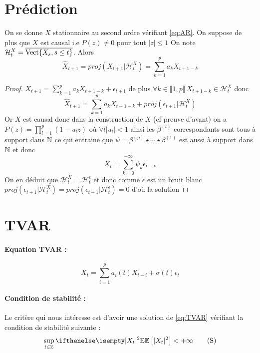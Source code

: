 \documentclass[a4paper,french]{article}
\begin{document}
\section{Prédiction}
\begin{Prop}
On se donne $X$ stationnaire au second ordre vérifiant \eqref{eq:AR}. On suppose de plus que $X$ est causal i.e $P(z) \neq 0$ pour tout $|z| \leq 1$
On note $\mathcal{H}_t^X = \overline{\mathrm{Vect}{ \left\lbrace X_s, s\leq t \right\rbrace }}$. Alors
\[ \hat{X}_{t+1} = proj(X_{t+1} | \mathcal{H}_t^X ) = \sum_{k=1}^p a_k X_{t+1-k} \]
\end{Prop}
\begin{proof}
$X_{t+1} = \sum_{k=1}^p a_k X_{t+1-k} +\epsilon_{t+1}$ de plus $\forall k \in \llbracket 1,p \rrbracket \, X_{t+1-k} \in \mathcal{H}_t^X$ donc
\[ \hat{X}_{t+1} = \sum_{k=1}^p a_k X_{t+1-k} + proj(\epsilon_{t+1} | \mathcal{H}_t^X ) \]
Or $X$ est causal donc dans la construction de $X$ (cf preuve d'avant) on a $P(z)= \prod_{l=1}^p (1-u_l z)$ où $\forall l |u_l|<1$ ainsi les $\beta^{(l)}$ correspondants sont tous à support dans $\mathbb{N}$ ce qui entraine que $\psi = \beta^{(p)} \star \cdots \star \beta^{(1)}$ est aussi à support dans $\mathbb{N}$ et donc 
\[ X_t = \sum_{k=0}^{+\infty} \psi_k \epsilon_{t-k}\] On en déduit que $\mathcal{H}_t^X = \mathcal{H}_t^\epsilon$ et donc comme $\epsilon$ est un bruit blanc $proj(\epsilon_{t+1} | \mathcal{H}_t^X ) = proj(\epsilon_{t+1} | \mathcal{H}_t^\epsilon ) = 0$ d'où la solution
\end{proof}

\section{TVAR}
\paragraph{Equation TVAR :}
\begin{equation} \label{eq:TVAR}
X_t = \sum_{i=1}^p a_i(t) X_{t-i} + \sigma(t) \epsilon_t
\tag{TVAR}
\end{equation}
\paragraph{Condition de stabilité :}
Le critère qui nous intéresse est d'avoir une solution de \eqref{eq:TVAR} vérifiant la condition de stabilité suivante :
\begin{equation} \label{eq:stabilite}
\sup_{t\in \zset} \EE[|X_t|^2] < +\infty
\tag{S}
\end{equation}
\end{document}
